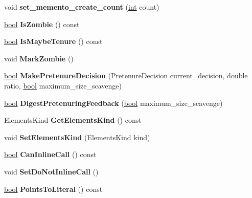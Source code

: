 \begin{DoxyCompactItemize}
void {\bfseries set\+\_\+memento\+\_\+create\+\_\+count} (\mbox{\hyperlink{classint}{int}} count)
\item 
\mbox{\label{classv8_1_1internal_1_1AllocationSite_ab6c24df9ffa655f7797f28fc251099a6}} 
\mbox{\hyperlink{classbool}{bool}} {\bfseries Is\+Zombie} () const
\item 
\mbox{\label{classv8_1_1internal_1_1AllocationSite_a3ea3a12843ded3e0f95c7b1fc0e3d5bd}} 
\mbox{\hyperlink{classbool}{bool}} {\bfseries Is\+Maybe\+Tenure} () const
\item 
\mbox{\label{classv8_1_1internal_1_1AllocationSite_af432e0790ebdfc00d36c9a6234e98389}} 
void {\bfseries Mark\+Zombie} ()
\item 
\mbox{\label{classv8_1_1internal_1_1AllocationSite_ac56e44521833202855156f6c8f06101f}} 
\mbox{\hyperlink{classbool}{bool}} {\bfseries Make\+Pretenure\+Decision} (Pretenure\+Decision current\+\_\+decision, double ratio, \mbox{\hyperlink{classbool}{bool}} maximum\+\_\+size\+\_\+scavenge)
\item 
\mbox{\label{classv8_1_1internal_1_1AllocationSite_ab06a9db3e9fa8256f8cd97cc5cefeff5}} 
\mbox{\hyperlink{classbool}{bool}} {\bfseries Digest\+Pretenuring\+Feedback} (\mbox{\hyperlink{classbool}{bool}} maximum\+\_\+size\+\_\+scavenge)
\item 
\mbox{\label{classv8_1_1internal_1_1AllocationSite_a1add82cc1996137a15e395fbf2a2e09f}} 
Elements\+Kind {\bfseries Get\+Elements\+Kind} () const
\item 
\mbox{\label{classv8_1_1internal_1_1AllocationSite_adf1136948311998f7ead14bcf8f2cfd8}} 
void {\bfseries Set\+Elements\+Kind} (Elements\+Kind kind)
\item 
\mbox{\label{classv8_1_1internal_1_1AllocationSite_aab240b53ca5f3f2cd6fe7698e69bf082}} 
\mbox{\hyperlink{classbool}{bool}} {\bfseries Can\+Inline\+Call} () const
\item 
\mbox{\label{classv8_1_1internal_1_1AllocationSite_a3e9fcf250995d87d2c31e05c6e4e6ce5}} 
void {\bfseries Set\+Do\+Not\+Inline\+Call} ()
\item 
\mbox{\label{classv8_1_1internal_1_1AllocationSite_a1ada880cd600c59f8de3bfa32fdc956a}} 
\mbox{\hyperlink{classbool}{bool}} {\bfseries Points\+To\+Literal} () const
\end{DoxyCompactItemize}
